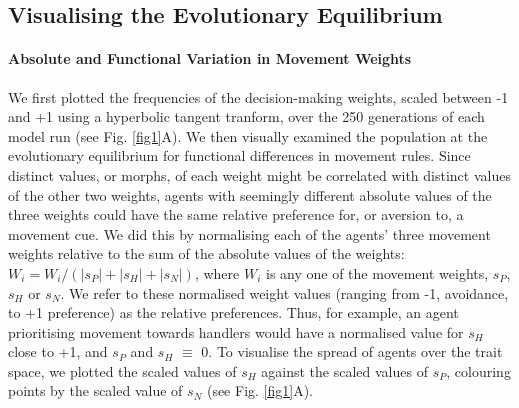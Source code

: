     
    \subsection*{Visualising the Evolutionary Equilibrium}
    
    \paragraph{Absolute and Functional Variation in Movement Weights}
    
    We first plotted the frequencies of the decision-making weights, scaled between -1 and +1 using a hyperbolic tangent tranform, over the 250 generations of each model run (see Fig. \ref{fig1}A).
    We then visually examined the population at the evolutionary equilibrium for functional differences in movement rules.
    Since distinct values, or morphs, of each weight might be correlated with distinct values of the other two weights, agents with seemingly different absolute values of the three weights could have the same relative preference for, or aversion to, a movement cue.
    We did this by normalising each of the agents' three movement weights relative to the sum of the absolute values of the weights:
    $W_i = W_i / (|s_P| + |s_H| + |s_N|)$, where $W_i$ is any one of the movement weights, $s_P$, $s_H$ or $s_N$.
    We refer to these normalised weight values (ranging from -1, avoidance, to +1 preference) as the relative preferences.
    Thus, for example, an agent prioritising movement towards handlers would have a normalised value for $s_H$ close to +1, and $s_P$ and $s_H$ $\equiv$ 0.
    To visualise the spread of agents over the trait space, we plotted the scaled values of $s_H$ against the scaled values of $s_P$, colouring points by the scaled value of $s_N$ (see Fig. \ref{fig1}A).
    
